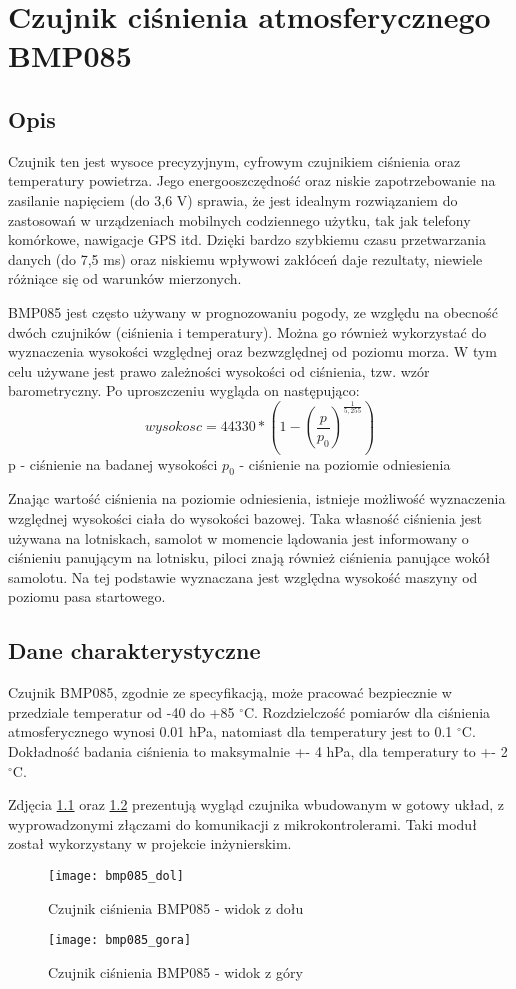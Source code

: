 \chapter{Czujnik ciśnienia atmosferycznego BMP085}
\section*{Opis}
Czujnik ten jest wysoce precyzyjnym, cyfrowym czujnikiem ciśnienia oraz temperatury powietrza. Jego energooszczędność oraz niskie zapotrzebowanie na zasilanie napięciem (do 3,6 V) sprawia, że jest idealnym rozwiązaniem do zastosowań w urządzeniach mobilnych codziennego użytku, tak jak telefony komórkowe, nawigacje GPS itd. Dzięki bardzo szybkiemu czasu przetwarzania danych (do 7,5 ms) oraz niskiemu wpływowi zakłóceń daje rezultaty, niewiele różniące się od warunków mierzonych.


BMP085 jest często używany w prognozowaniu pogody, ze względu na obecność dwóch czujników (ciśnienia i temperatury). Można go również wykorzystać do wyznaczenia wysokości względnej oraz bezwzględnej od poziomu morza. W tym celu używane jest prawo zależności wysokości od ciśnienia, tzw. wzór barometryczny. Po uproszczeniu wygląda on następująco:
$$ wysokosc = 44330 * (1- (\frac{p}{p_{0}})^{\frac{1}{5,255}}) $$
p - ciśnienie na badanej wysokości\newline
$ p_{0} $ - ciśnienie na poziomie odniesienia
\newline

Znając wartość ciśnienia na poziomie odniesienia, istnieje możliwość wyznaczenia względnej wysokości ciała do wysokości bazowej. Taka własność ciśnienia jest używana na lotniskach, samolot w momencie lądowania jest informowany o ciśnieniu panującym na lotnisku, piloci znają również ciśnienia panujące wokół samolotu. Na tej podstawie wyznaczana jest względna wysokość maszyny od poziomu pasa startowego.

\section*{Dane charakterystyczne}
Czujnik BMP085, zgodnie ze specyfikacją, może pracować bezpiecznie w przedziale temperatur od -40 do +85 $^\circ$C. Rozdzielczość pomiarów dla ciśnienia atmosferycznego wynosi 0.01 hPa, natomiast dla temperatury jest to 0.1 $^\circ$C. Dokładność badania ciśnienia to maksymalnie +- 4 hPa, dla temperatury to +- 2$^\circ$C.

Zdjęcia \ref{fig:bmp085_dol} oraz \ref{fig:bmp085_gora} prezentują wygląd czujnika wbudowanym w gotowy układ, z wyprowadzonymi złączami do komunikacji z mikrokontrolerami. Taki moduł został wykorzystany w projekcie inżynierskim.
\begin{figure}[h]
\centering
\texttt{[image: bmp085\_dol]}
\caption{Czujnik ciśnienia BMP085 - widok z dołu}
\label{fig:bmp085_dol}
\end{figure}
\begin{figure}[h]
\centering
\texttt{[image: bmp085\_gora]}
\caption{Czujnik ciśnienia BMP085 - widok z góry}
\label{fig:bmp085_gora}
\end{figure}


